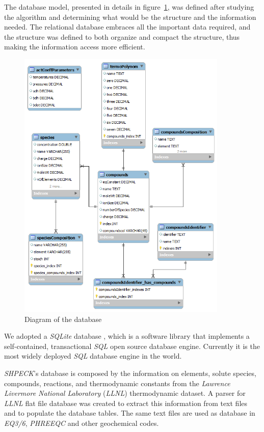 \documentclass[preprint,12pt,3p]{elsarticle}
\begin{document}
The database model, presented in details in figure~\ref{fig:ERDiagram}, was defined after studying the algorithm and determining what would be the structure and the information needed.  The relational database embraces all the important data required, and the structure was defined to both organize and compact the structure, thus making the information access more efficient. 

\begin{figure}[ht!]
\centering
\includegraphics[width=100mm]{ER_diagram.png}
\caption{Diagram of the database}
\label{fig:ERDiagram}
\end{figure}

We adopted a \emph{SQLite} database \cite{SQLite}, which is a software library that implements a self-contained, transactional \emph{SQL} open source database engine. Currently it is the most widely deployed \emph{SQL} database engine in the world.

\emph{SHPECK}'s database is composed by the information on elements, solute species, compounds, reactions, and thermodynamic constants from the \emph{Lawrence Livermore National Laboratory} (\emph{LLNL}) thermodynamic dataset. A parser for \emph{LLNL} flat file database was created to extract this information from text files and to populate the database tables. The same text files are used as database in \emph{EQ3/6}, \emph{PHREEQC} and other geochemical codes.
\end{document}

